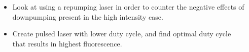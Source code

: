 \documentclass[
30pt,%
a1paper, 
landscape,%
margin = 0mm,
innermargin = -2cm,
colspace = 5mm,
subcolspace = 0mm,
blockverticalspace=.5cm %
]{tikzposter}
\begin{document}
\begin{columns}
{	}



	{
		\begin{itemize}
			\item Look at using a repumping laser in order to counter the negative effects of downpumping present in the high intensity case. 
			\item Create pulsed laser with lower duty cycle, and find optimal duty cycle that results in highest fluorescence.
		\end{itemize}
		
	}
\end{columns}
\end{document}
